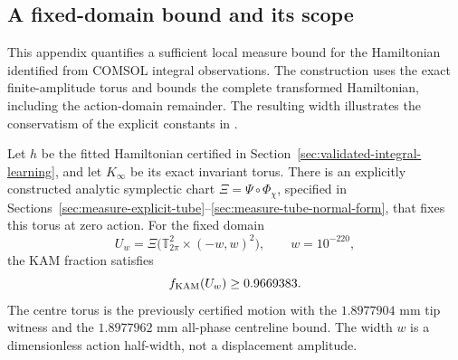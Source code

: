\label{app:measure-proof}
\subsection{A fixed-domain bound and its scope}
\label{sec:measure-fixed-tube}

This appendix quantifies a sufficient local measure bound for the
Hamiltonian identified from COMSOL integral observations. The construction
uses the exact finite-amplitude torus and bounds the complete transformed
Hamiltonian, including the action-domain remainder. The resulting width
illustrates the conservatism of the explicit constants in
\citet{chierchia2021measure}.

\begin{samepage}
\begin{theorem}
\label{thm:measure-finite-tube}
Let $h$ be the fitted Hamiltonian certified in
Section~\ref{sec:validated-integral-learning}, and let $K_\infty$ be its
exact invariant torus. There is an explicitly constructed analytic
symplectic chart $\Xi=\Psi\circ\Phi_{\chi}$, specified in
Sections~\ref{sec:measure-explicit-tube}--\ref{sec:measure-tube-normal-form},
that fixes this torus at zero action.
For the fixed domain
\begin{equation}
 U_w=\Xi\bigl(\mathbb T^2_{2\pi}\times(-w,w)^2\bigr),
 \qquad w=10^{-220},
 \label{eq:measure-fixed-tube}
\end{equation}
the KAM fraction satisfies
\begin{equation}
 f_{\rm KAM}(U_w)\geq0.9669383.
 \label{eq:measure-certified-fraction}
\end{equation}
The centre torus is the previously certified motion with the
$1.8977904$ mm tip witness and the $1.8977962$ mm all-phase centreline
bound. The width $w$ is a dimensionless action half-width, not a
displacement amplitude.
\end{theorem}
\end{samepage}

